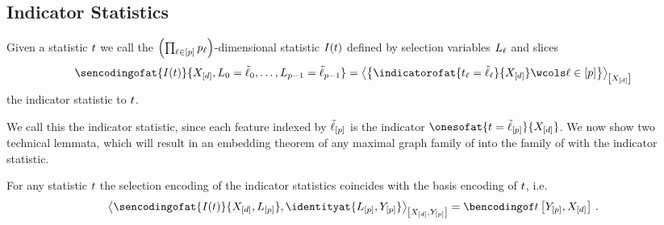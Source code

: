\documentclass[aps,onecolumn,nofootinbib,pra]{article}
\begin{document}
    \subsection{Indicator Statistics}

    \begin{definition} %
        Given a statistic $t$ we call the $\left(\prod_{\ell\in[p]}p_{\ell}\right)$-dimensional statistic $I(t)$ defined by selection variables $L_{\ell}$ and slices
        \begin{align*}
            \sencodingofat{I(\sstat)}{\shortcatvariables,\selvariableof{0}=\secselindex_0,\ldots,\selvariableof{\seldim-1}=\secselindex_{\seldim-1}}
            = \contractionof{\left\{\indicatorofat{\sstatcoordinateof{\selindex} = \secselindex_{\selindex}}{\shortcatvariables} \wcols \selindexin \right\}}{\shortcatvariables}
        \end{align*}
        the indicator statistic to $t$.
    \end{definition}

    We call this the indicator statistic, since each feature indexed by $\tilde{\ell}_{[p]}$ is the indicator $\onesofat{\sstat=\secselindex_{[\seldim]}}{\shortcatvariables}$.
    We now show two technical lemmata, which will result in an embedding theorem of any maximal graph family of \ComputationActivationNetworks{} into the family of \HybridLogicNetworks{} with the indicator statistic.

    \begin{lemma}
        \label{lem:sencToIndBenc}
        For any statistic $t$ the selection encoding of the indicator statistics coincides with the basis encoding of $t$, i.e.
        \begin{align*}
            \contractionof{
                \sencodingofat{I(\sstat)}{\shortcatvariables,\selvariableof{[\seldim]}},\identityat{\selvariableof{[\seldim]},\headvariables}
            }{\shortcatvariables,\headvariables}
            = \bencsstatwith \, .
        \end{align*}
    \end{lemma}
\end{document}
